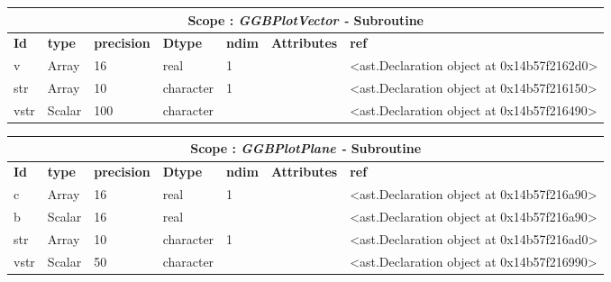 \documentclass{report}
\begin{document}
 \vspace{1cm}

\begin{center}
\begin{longtable}{|p{3.5cm}|p{1.5cm}|p{1.5cm}|p{1.5cm}|p{1cm}|p{2cm}|p{4cm}| }
\hline
\multicolumn{7}{|c|}{\textbf{Scope : \qquad}  \textbf{\textit{GGBPlotVector - }Subroutine}}\\ 
\hline
\textbf{Id} & \textbf{type} & \textbf{precision} & \textbf{Dtype} & \textbf{ndim} & \textbf{Attributes} & \textbf{ref} \\\hline

v & Array & 16 & real & 1 &  & <ast.Declaration object at 0x14b57f2162d0> \\\hline

str & Array & 10 & character & 1 &  & <ast.Declaration object at 0x14b57f216150> \\\hline

vstr & Scalar & 100 & character &  &  & <ast.Declaration object at 0x14b57f216490> \\\hline

\end{longtable}
\end{center}

 \vspace{1cm}

\begin{center}
\begin{longtable}{|p{3.5cm}|p{1.5cm}|p{1.5cm}|p{1.5cm}|p{1cm}|p{2cm}|p{4cm}| }
\hline
\multicolumn{7}{|c|}{\textbf{Scope : \qquad}  \textbf{\textit{GGBPlotPlane - }Subroutine}}\\ 
\hline
\textbf{Id} & \textbf{type} & \textbf{precision} & \textbf{Dtype} & \textbf{ndim} & \textbf{Attributes} & \textbf{ref} \\\hline

c & Array & 16 & real & 1 &  & <ast.Declaration object at 0x14b57f216a90> \\\hline

b & Scalar & 16 & real &  &  & <ast.Declaration object at 0x14b57f216a90> \\\hline

str & Array & 10 & character & 1 &  & <ast.Declaration object at 0x14b57f216ad0> \\\hline

vstr & Scalar & 50 & character &  &  & <ast.Declaration object at 0x14b57f216990> \\\hline

\end{longtable}
\end{center}
\end{document}
